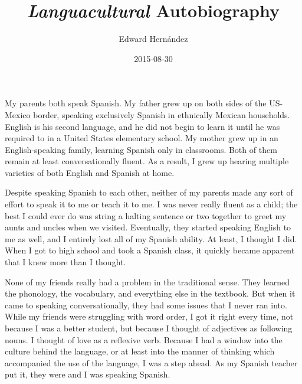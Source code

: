\documentclass[doc,12pt]{apa6}
\begin{document}
\title{\textit{Languacultural} Autobiography}
\author{Edward Hern\'{a}ndez}
\date{2015-08-30}
\maketitle



My parents both speak Spanish. My father grew up on both sides of the US-Mexico border, 
speaking exclusively Spanish in ethnically Mexican households. English is his second 
language, and he did not begin to learn it until he was required to in a United States 
elementary school. My mother grew up in an English-speaking family, learning Spanish 
only in classrooms. Both of them remain at least conversationally fluent. As a result, I 
grew up hearing multiple varieties of both English and Spanish at home.

Despite speaking Spanish to each other, neither of my parents made any sort of effort to 
speak it to me or teach it to me. I was never really fluent as a child; the best I could 
ever do was string a halting sentence or two together to greet my aunts and uncles when 
we visited. Eventually, they started speaking English to me as well, and I entirely lost 
all of my Spanish ability. At least, I thought I did. When I got to high school and took 
a Spanish class, it quickly became apparent that I knew more than I thought.

None of my friends really had a problem  in the traditional sense. 
They learned the phonology, the vocabulary, and everything else in the textbook. But 
when it came to speaking conversationally, they had some issues that I never ran into. 
While my friends were struggling with word order, I got it right every time, not because 
I was a better student, but because I thought of adjectives as following nouns. I 
thought of love as a reflexive verb. Because I had a window into the culture behind the 
language, or at least into the manner of thinking which accompanied the use of the 
language, I was a step ahead. As my Spanish teacher put it, they were  and I was speaking Spanish.
\end{document}
